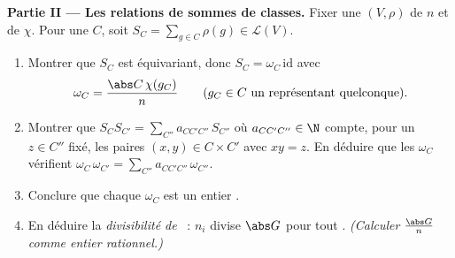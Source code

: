 \begin{problem}
\medskip
\noindent\textbf{Partie II --- Les relations de sommes de
classes.} Fixer une  $(V, \rho)$ de  $n$ et de
 $\chi$. Pour une  $C$, soit $S_C
= \sum_{g \in C}\rho(g) \in \mathcal L(V)$.
\begin{enumerate}[resume]
  \item Montrer que $S_C$ est équivariant, donc $S_C =
        \omega_C\,\mathrm{id}$ avec
        \[
        \omega_C = \frac{\abs C\,\chi(g_C)}{n}
        \qquad (g_C \in C \text{ un représentant quelconque}).
        \]
  \item Montrer que $S_CS_{C'} = \sum_{C''}
        a_{CC'C''}\,S_{C''}$ où $a_{CC'C''} \in \N$ compte,
        pour un $z \in C''$ fixé, les paires $(x, y) \in C
        \times C'$ avec $xy = z$. En déduire que les $\omega_C$
        vérifient $\omega_C\,\omega_{C'} = \sum_{C''}
        a_{CC'C''}\,\omega_{C''}$.
  \item Conclure que chaque $\omega_C$ est un entier
        .
  \item En déduire la \emph{divisibilité de }~: $n_i$
        divise $\abs G$ pour tout  .
        \emph{(Calculer $\frac{\abs G}{n}$ comme entier
         rationnel.)}
\end{enumerate}


\end{problem}
